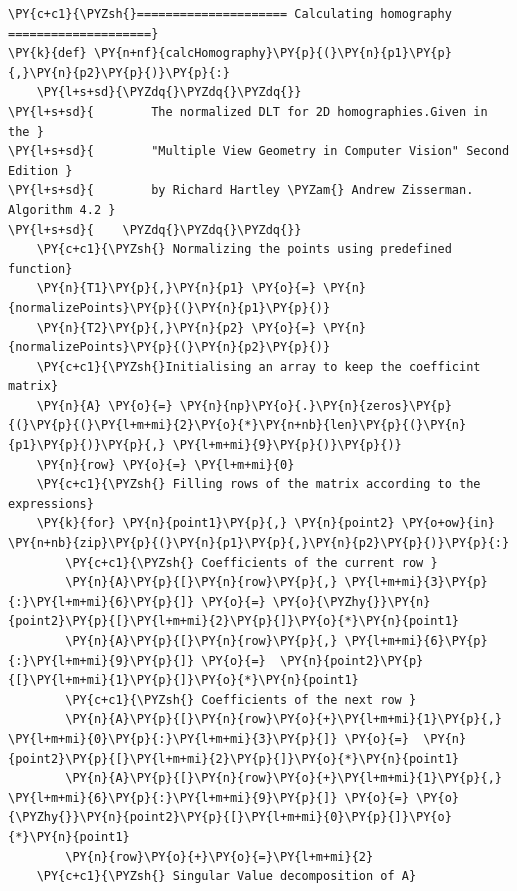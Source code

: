 \documentclass[a4paper,11pt]{article}%
\begin{document}
   \begin{tcolorbox}[breakable, size=fbox, boxrule=1pt, pad at break*=1mm,colback=cellbackground, colframe=cellborder]
	\begin{Verbatim}[commandchars=\\\{\}]
\PY{c+c1}{\PYZsh{}===================== Calculating homography ====================}
\PY{k}{def} \PY{n+nf}{calcHomography}\PY{p}{(}\PY{n}{p1}\PY{p}{,}\PY{n}{p2}\PY{p}{)}\PY{p}{:}
    \PY{l+s+sd}{\PYZdq{}\PYZdq{}\PYZdq{}}
\PY{l+s+sd}{        The normalized DLT for 2D homographies.Given in the }
\PY{l+s+sd}{        "Multiple View Geometry in Computer Vision" Second Edition }
\PY{l+s+sd}{        by Richard Hartley \PYZam{} Andrew Zisserman. Algorithm 4.2 }
\PY{l+s+sd}{    \PYZdq{}\PYZdq{}\PYZdq{}}
    \PY{c+c1}{\PYZsh{} Normalizing the points using predefined function}
    \PY{n}{T1}\PY{p}{,}\PY{n}{p1} \PY{o}{=} \PY{n}{normalizePoints}\PY{p}{(}\PY{n}{p1}\PY{p}{)}
    \PY{n}{T2}\PY{p}{,}\PY{n}{p2} \PY{o}{=} \PY{n}{normalizePoints}\PY{p}{(}\PY{n}{p2}\PY{p}{)}
    \PY{c+c1}{\PYZsh{}Initialising an array to keep the coefficint matrix}
    \PY{n}{A} \PY{o}{=} \PY{n}{np}\PY{o}{.}\PY{n}{zeros}\PY{p}{(}\PY{p}{(}\PY{l+m+mi}{2}\PY{o}{*}\PY{n+nb}{len}\PY{p}{(}\PY{n}{p1}\PY{p}{)}\PY{p}{,} \PY{l+m+mi}{9}\PY{p}{)}\PY{p}{)}
    \PY{n}{row} \PY{o}{=} \PY{l+m+mi}{0}
    \PY{c+c1}{\PYZsh{} Filling rows of the matrix according to the expressions}
    \PY{k}{for} \PY{n}{point1}\PY{p}{,} \PY{n}{point2} \PY{o+ow}{in} \PY{n+nb}{zip}\PY{p}{(}\PY{n}{p1}\PY{p}{,}\PY{n}{p2}\PY{p}{)}\PY{p}{:}
        \PY{c+c1}{\PYZsh{} Coefficients of the current row }
        \PY{n}{A}\PY{p}{[}\PY{n}{row}\PY{p}{,} \PY{l+m+mi}{3}\PY{p}{:}\PY{l+m+mi}{6}\PY{p}{]} \PY{o}{=} \PY{o}{\PYZhy{}}\PY{n}{point2}\PY{p}{[}\PY{l+m+mi}{2}\PY{p}{]}\PY{o}{*}\PY{n}{point1}
        \PY{n}{A}\PY{p}{[}\PY{n}{row}\PY{p}{,} \PY{l+m+mi}{6}\PY{p}{:}\PY{l+m+mi}{9}\PY{p}{]} \PY{o}{=}  \PY{n}{point2}\PY{p}{[}\PY{l+m+mi}{1}\PY{p}{]}\PY{o}{*}\PY{n}{point1}
        \PY{c+c1}{\PYZsh{} Coefficients of the next row }
        \PY{n}{A}\PY{p}{[}\PY{n}{row}\PY{o}{+}\PY{l+m+mi}{1}\PY{p}{,} \PY{l+m+mi}{0}\PY{p}{:}\PY{l+m+mi}{3}\PY{p}{]} \PY{o}{=}  \PY{n}{point2}\PY{p}{[}\PY{l+m+mi}{2}\PY{p}{]}\PY{o}{*}\PY{n}{point1}
        \PY{n}{A}\PY{p}{[}\PY{n}{row}\PY{o}{+}\PY{l+m+mi}{1}\PY{p}{,} \PY{l+m+mi}{6}\PY{p}{:}\PY{l+m+mi}{9}\PY{p}{]} \PY{o}{=} \PY{o}{\PYZhy{}}\PY{n}{point2}\PY{p}{[}\PY{l+m+mi}{0}\PY{p}{]}\PY{o}{*}\PY{n}{point1}    
        \PY{n}{row}\PY{o}{+}\PY{o}{=}\PY{l+m+mi}{2}    
    \PY{c+c1}{\PYZsh{} Singular Value decomposition of A}

\end{Verbatim}
\end{tcolorbox}
\end{document}
